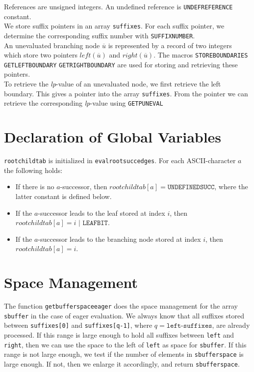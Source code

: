 \documentclass[a4paper]{article}
\begin{document}
References are unsigned integers. An undefined reference is
\texttt{UNDEFREFERENCE} constant.\\

We store suffix pointers in an array \texttt{suffixes}. For each suffix
pointer, we determine the corresponding suffix number with
\texttt{SUFFIXNUMBER}.\\

An unevaluated branching node \(\overline{u}\) is represented by a record of
two integers which store two pointers \(\mathit{left}(\overline{u})\) and
\(\mathit{right}(\overline{u})\). The macros \texttt{STOREBOUNDARIES}
\texttt{GETLEFTBOUNDARY} \texttt{GETRIGHTBOUNDARY} are used for storing and
retrieving these pointers.\\

To retrieve the \emph{lp}-value of an unevaluated node, we first retrieve the
left boundary. This gives a pointer into the array \texttt{suffixes}. From the
pointer we can retrieve the corresponding \emph{lp}-value using
\texttt{GETPUNEVAL}

\section{Declaration of Global Variables}

  \texttt{rootchildtab} is initialized in \texttt{evalrootsuccedges}.
  For each ASCII-character \(a\) the following holds:

  \begin{itemize}
    \item
        If there is no \(a\)-successor, then
        \(rootchildtab[a]=\texttt{UNDEFINEDSUCC}\), where the latter constant is
        defined below.
    \item
        If the \(a\)-successor leads to the leaf stored at index \(i\), then
        \(rootchildtab[a]=i\texttt{ | LEAFBIT}\).
    \item
        If the \(a\)-successor leads to the branching node stored at index \(i\),
        then \(rootchildtab[a]=i\).
  \end{itemize}

\section{Space Management}

The function \texttt{getbufferspaceeager} does the space management for the
array \texttt{sbuffer} in the case of eager evaluation. We always know that all
suffixes stored between \texttt{suffixes[0]} and \texttt{suffixes[q-1]}, where
\(q=\texttt{left-suffixes}\), are already processed. If this range is large
enough to hold all suffixes between \texttt{left} and \texttt{right}, then we
can use the space to the left of \texttt{left} as space for \texttt{sbuffer}.
If this range is not large enough, we test if the number of elements in
\texttt{sbufferspace} is large enough. If not, then we enlarge it accordingly,
and return \texttt{sbufferspace}.\\
\end{document}

